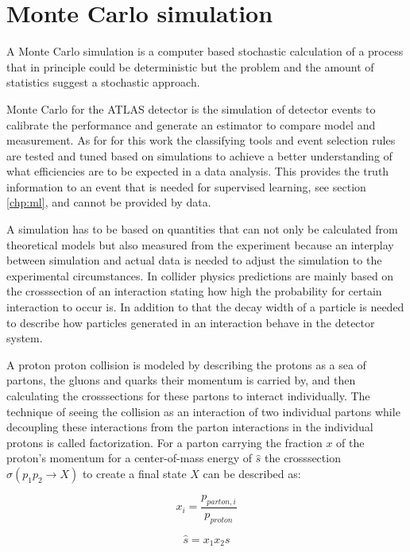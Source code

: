 \section{Monte Carlo simulation}

A Monte Carlo simulation is a computer based stochastic calculation of a process that in principle could be deterministic but the problem and the amount of statistics suggest a stochastic approach.

Monte Carlo for the ATLAS detector is the simulation of detector events to calibrate the performance and generate an estimator to compare model and measurement. As for for this work the classifying tools and event selection rules are tested and tuned based on simulations to achieve a better understanding of what efficiencies are to be expected in a data analysis. This provides the truth information to an event that is needed for supervised learning, see section \ref{chp:ml}, and cannot be provided by data.

A simulation has to be based on quantities that can not only be calculated from theoretical models but also measured from the experiment because an interplay between simulation and actual data is needed to adjust the simulation to the experimental circumstances. In collider physics predictions are mainly based on  the crosssection of an interaction stating how high the probability for certain interaction to occur is. In addition to that the decay width of a particle is needed to describe how particles generated in an interaction behave in the detector system.

A proton proton collision is modeled by describing the protons as a sea of partons, the gluons and quarks their momentum is carried by, and then calculating the crosssections for these partons to interact individually. The technique of seeing the collision as an interaction of two individual partons while decoupling these interactions from the parton interactions in the individual protons is called factorization.
For a parton carrying the fraction $x$ of the proton's momentum for a center-of-mass energy of $\hat{s}$  the crosssection $\sigma(p_1 p_2 \rightarrow X)$ to create a final state $X$ can be described as:


\noindent\begin{minipage}{.5\linewidth}
\begin{equation}
	x_i = \frac{p_{parton,i}}{p_{proton}} 
\end{equation}
\end{minipage}%
\begin{minipage}{.5\linewidth}
\begin{equation}
	\hat{s} = x_1 x_2 s
\end{equation}
\end{minipage}

